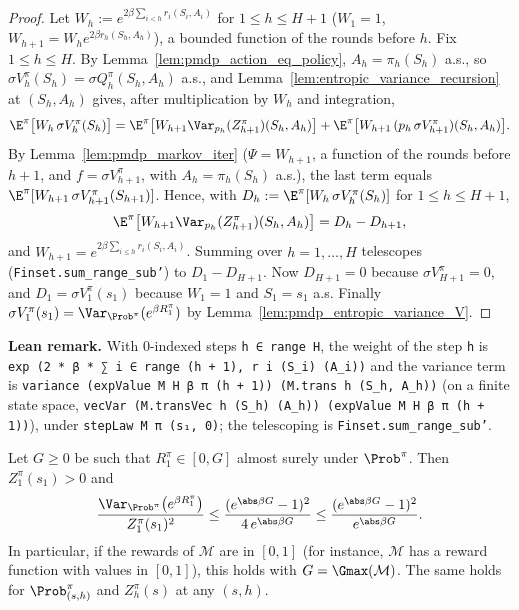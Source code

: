 \begin{proof}
\leanok
Let $W_h := e^{2\beta\sum_{i < h} r_i(S_i, A_i)}$ for $1 \le h \le H + 1$ ($W_1 = 1$,
$W_{h+1} = W_h e^{2\beta r_h(S_h, A_h)}$), a bounded function of the rounds before $h$. Fix
$1 \le h \le H$. By Lemma~\ref{lem:pmdp_action_eq_policy}, $A_h = \pi_h(S_h)$ a.s., so
$\sigma V^\pi_h(S_h) = \sigma Q^\pi_h(S_h, A_h)$ a.s., and Lemma~\ref{lem:entropic_variance_recursion}
at $(S_h, A_h)$ gives, after multiplication by $W_h$ and integration,
\[
  \E^\pi\big[W_h\,\sigma V^\pi_h(S_h)\big]
  = \E^\pi\big[W_{h+1}\Var_{p_h}(Z^\pi_{h+1})(S_h, A_h)\big]
  + \E^\pi\big[W_{h+1}\,(p_h\,\sigma V^\pi_{h+1})(S_h, A_h)\big] .
\]
By Lemma~\ref{lem:pmdp_markov_iter} ($\Psi = W_{h+1}$, a function of the rounds before $h + 1$,
and $f = \sigma V^\pi_{h+1}$, with $A_h = \pi_h(S_h)$ a.s.), the last term equals
$\E^\pi[W_{h+1}\,\sigma V^\pi_{h+1}(S_{h+1})]$. Hence, with $D_h := \E^\pi[W_h\,\sigma V^\pi_h(S_h)]$
for $1 \le h \le H + 1$,
\[
  \E^\pi\big[W_{h+1}\Var_{p_h}(Z^\pi_{h+1})(S_h, A_h)\big] = D_h - D_{h+1} ,
\]
and $W_{h+1} = e^{2\beta\sum_{i \le h} r_i(S_i,A_i)}$. Summing over $h = 1, \dots, H$ telescopes
(\texttt{Finset.sum\_range\_sub'}) to $D_1 - D_{H+1}$. Now $D_{H+1} = 0$ because
$\sigma V^\pi_{H+1} = 0$, and $D_1 = \sigma V^\pi_1(s_1)$ because $W_1 = 1$ and $S_1 = s_1$ a.s.
Finally $\sigma V^\pi_1(s_1) = \Var_{\Prob^\pi}(e^{\beta R^\pi_1})$ by
Lemma~\ref{lem:pmdp_entropic_variance_V}.
\end{proof}

\textbf{Lean remark.} With $0$-indexed steps \texttt{h ∈ range H}, the weight of the step
\texttt{h} is \texttt{exp (2 * β * ∑ i ∈ range (h + 1), r i (S\_i) (A\_i))} and the variance term is
\texttt{variance (expValue M H β π (h + 1)) (M.trans h (S\_h, A\_h))} (on a finite state space,
\texttt{vecVar (M.transVec h (S\_h) (A\_h)) (expValue M H β π (h + 1))}), under
\texttt{stepLaw M π (s₁, 0)}; the telescoping is \texttt{Finset.sum\_range\_sub'}.

\begin{lemma}\label{lem:variance_ratio_le}
\leanok
{}
Let $G \ge 0$ be such that $R^\pi_1 \in [0, G]$ almost surely under $\Prob^\pi$. Then
$Z^\pi_1(s_1) > 0$ and
\[
  \frac{\Var_{\Prob^\pi}\big(e^{\beta R^\pi_1}\big)}{Z^\pi_1(s_1)^2}
  \le \frac{(e^{\abs\beta G} - 1)^2}{4\,e^{\abs\beta G}}
  \le \frac{(e^{\abs\beta G} - 1)^2}{e^{\abs\beta G}} .
\]
In particular, if the rewards of $\mathcal M$ are in $[0, 1]$ (for instance, $\mathcal M$ has a
reward function with values in $[0, 1]$), this holds with $G = \Gmax(\mathcal M)$. The same holds
for $\Prob^\pi_{(s,h)}$ and $Z^\pi_h(s)$ at any $(s, h)$.
\end{lemma}

